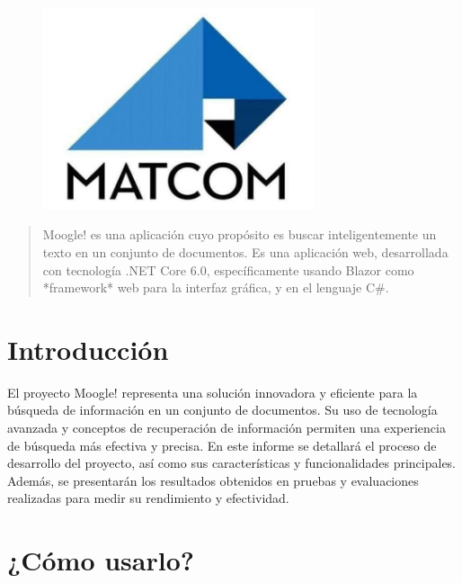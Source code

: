 \documentclass[a4paper, 12pt]{article}
\begin{document}
\begin{center}
\\
\vspace {2cm}
\\
\vspace {1cm}
\\
\vspace {0.5cm}
\\
\vspace {10cm}
\begin{figure}[h]
       \center
       \includegraphics[width=8cm]{matcom.jpg}
\end{figure}
\end{center}

\newpage
\begin{abstract}
Moogle! es una aplicación  cuyo propósito es buscar inteligentemente un texto en un conjunto de documentos. Es una aplicación web, desarrollada con tecnología .NET Core 6.0, específicamente usando Blazor como *framework* web para la interfaz gráfica, y en el lenguaje C\#.
\end{abstract}

\tableofcontents
\newpage

\section{Introducción}\label{sec;intro}
El proyecto Moogle! representa una solución innovadora y eficiente para la búsqueda de información en un conjunto de documentos. Su uso de tecnología avanzada y conceptos de recuperación de información permiten una experiencia de búsqueda más efectiva y precisa. En este informe se detallará el proceso de desarrollo del proyecto, así como sus características y funcionalidades principales. Además, se presentarán los resultados obtenidos en pruebas y evaluaciones realizadas para medir su rendimiento y efectividad.

\newpage
\section{¿Cómo usarlo?}
\end{document}
